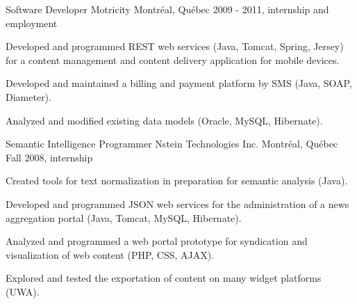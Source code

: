 \begin{cventries}
  \cventry
    {Software Developer} %
    {Motricity} %
    {Montréal, Québec} %
    {2009 - 2011, internship and employment} %
    {
      \begin{cvitems} %
        \item {Developed and programmed REST web services (Java, Tomcat, Spring, Jersey) for a content management and content delivery application for mobile devices.}
        \item {Developed and maintained a billing and payment platform by SMS (Java, SOAP, Diameter).}
        \item {Analyzed and modified existing data models (Oracle, MySQL, Hibernate).}
      \end{cvitems}
    }

  \cventry
    {Semantic Intelligence Programmer} %
    {Nstein Technologies Inc.} %
    {Montréal, Québec} %
    {Fall 2008, internship} %
    {
      \begin{cvitems} %
        \item {Created tools for text normalization in preparation for semantic analysis (Java).}
        \item {Developed and programmed JSON web services for the administration of a news aggregation portal (Java, Tomcat, MySQL, Hibernate).}
        \item {Analyzed and programmed a web portal prototype for syndication and visualization of web content (PHP, CSS, AJAX).}
        \item {Explored and tested the exportation of content on many widget platforms (UWA).}
      \end{cvitems}
    }

\end{cventries}